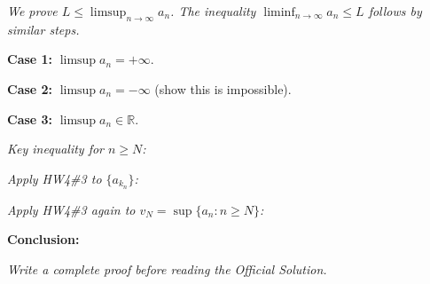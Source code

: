 \documentclass[12pt]{article}
\newcommand{\writespace}[1]{\vspace{#1}}
\begin{document}
\newpage

\begin{tcolorbox}[
  enhanced, breakable,
  colback  = pass4purple,
  colframe = purple!55!black,
  fonttitle = \bfseries,
  title = {Pass 4 \enspace\textbf{--}\enspace Skeleton Proof}
]
\noindent\textit{We prove $L \leq \limsup_{n\to\infty} a_n$. The inequality
$\liminf_{n\to\infty} a_n \leq L$ follows by similar steps.}

\medskip
\noindent\textbf{Case 1:} $\limsup a_n = +\infty$.\par
\writespace{1.6cm}

\noindent\textbf{Case 2:} $\limsup a_n = -\infty$ (show this is impossible).\par
\writespace{2.6cm}

\noindent\textbf{Case 3:} $\limsup a_n \in \mathbb{R}$.\par
\vspace{4pt}
\noindent\textit{Key inequality for $n \geq N$:}\par
\writespace{1.2cm}
\noindent\textit{Apply HW4\#3 to $\{a_{k_n}\}$:}\par
\writespace{1.4cm}
\noindent\textit{Apply HW4\#3 again to $v_N = \sup\{a_n : n \geq N\}$:}\par
\writespace{1.4cm}
\noindent\textbf{Conclusion:}\par
\writespace{0.8cm}
\end{tcolorbox}

\newpage

\begin{tcolorbox}[
  enhanced, breakable,
  colback  = pass5gray,
  colframe = black!38,
  fonttitle = \bfseries,
  title = {Pass 5 \enspace\textbf{--}\enspace Full Proof Attempt}
]
\small\itshape Write a complete proof before reading the Official Solution.\par
\normalfont\normalsize
\writespace{19cm}
\end{tcolorbox}

\newpage
\end{document}
